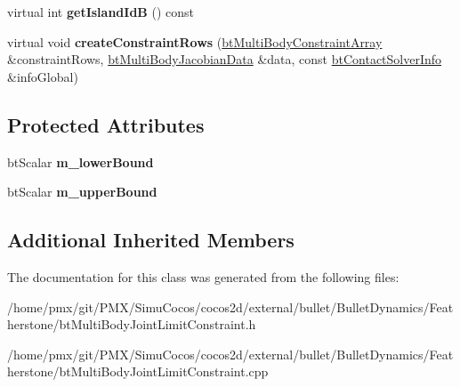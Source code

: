 \begin{DoxyCompactItemize}
\item 
\mbox{\label{classbtMultiBodyJointLimitConstraint_aac7674cc992607524076d1948f26bf7c}} 
virtual int {\bfseries get\+Island\+IdB} () const
\item 
\mbox{\label{classbtMultiBodyJointLimitConstraint_a03b7355e3622e0c50288910011cc9c3a}} 
virtual void {\bfseries create\+Constraint\+Rows} (\hyperlink{classbtAlignedObjectArray}{bt\+Multi\+Body\+Constraint\+Array} \&constraint\+Rows, \hyperlink{structbtMultiBodyJacobianData}{bt\+Multi\+Body\+Jacobian\+Data} \&data, const \hyperlink{structbtContactSolverInfo}{bt\+Contact\+Solver\+Info} \&info\+Global)
\end{DoxyCompactItemize}
\subsection*{Protected Attributes}
\begin{DoxyCompactItemize}
\item 
\mbox{\label{classbtMultiBodyJointLimitConstraint_a040e8ced5273f676f5dcdec8728c2d93}} 
bt\+Scalar {\bfseries m\+\_\+lower\+Bound}
\item 
\mbox{\label{classbtMultiBodyJointLimitConstraint_a8bc10d216ec92da50b9f08b151bd262c}} 
bt\+Scalar {\bfseries m\+\_\+upper\+Bound}
\end{DoxyCompactItemize}
\subsection*{Additional Inherited Members}


The documentation for this class was generated from the following files\+:\begin{DoxyCompactItemize}
\item 
/home/pmx/git/\+P\+M\+X/\+Simu\+Cocos/cocos2d/external/bullet/\+Bullet\+Dynamics/\+Featherstone/bt\+Multi\+Body\+Joint\+Limit\+Constraint.\+h\item 
/home/pmx/git/\+P\+M\+X/\+Simu\+Cocos/cocos2d/external/bullet/\+Bullet\+Dynamics/\+Featherstone/bt\+Multi\+Body\+Joint\+Limit\+Constraint.\+cpp\end{DoxyCompactItemize}
